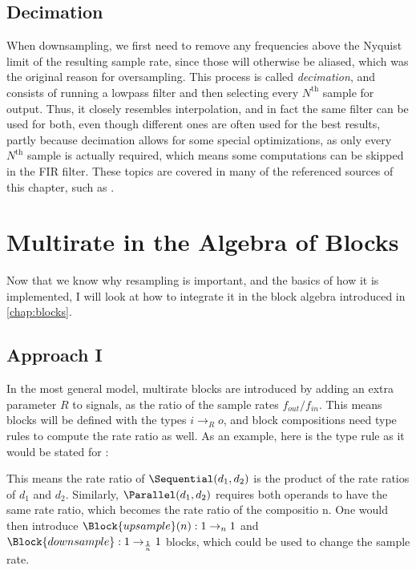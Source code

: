\subsection{Decimation}
\label{sec:decimation}

When downsampling, we first need to remove any frequencies above the Nyquist limit of the resulting sample
rate, since those will otherwise be aliased, which was the original reason for oversampling. This process is
called \emph{decimation}, and consists of running a lowpass filter and then selecting every
$N^\mathrm{th}$ sample for output. Thus, it closely resembles interpolation, and in fact the same
filter can be used for both, even though different ones are often used for the best results, partly because
decimation allows for some special optimizations, as only every $N^\mathrm{th}$ sample is actually
required, which means some computations can be skipped in the FIR filter. These topics are covered in many of
the referenced sources of this chapter, such as \autocite{kahles2019oversampling, SORIA2013, thomas2009}.

\section{Multirate in the Algebra of Blocks}
\label{sec:multirate_blocks}

Now that we know why resampling is important, and the basics of how it is implemented, I will look at how to
integrate it in the block algebra introduced in \autoref{chap:blocks}.

\subsection{Approach I}
\label{sec:multirate_blocks_1}
In the most general model, multirate blocks are introduced by adding an extra parameter
$R$ to signals, as the ratio of the sample rates $f_{out}/f_{in}$. This means blocks
will be defined with the types $i \rightarrow_R o$, and block compositions need type rules to compute the
rate ratio as well. As an example, here is the type rule as it would be stated for \Sequential:

\begin{prooftree}
\end{prooftree}

This means the rate ratio of $\Sequential(d_1, d_2)$ is the product of the rate ratios of
$d_1$ and $d_2$. Similarly, $\Parallel(d_1, d_2)$ requires both operands
to have the same rate ratio, which becomes the rate ratio of the compositio n. One would then introduce
$\Block{upsample}(n) : 1 \rightarrow_n 1$ and $\Block{downsample} : 1 \rightarrow_{\frac 1
    n} 1$ blocks, which could be used to change the sample rate.

